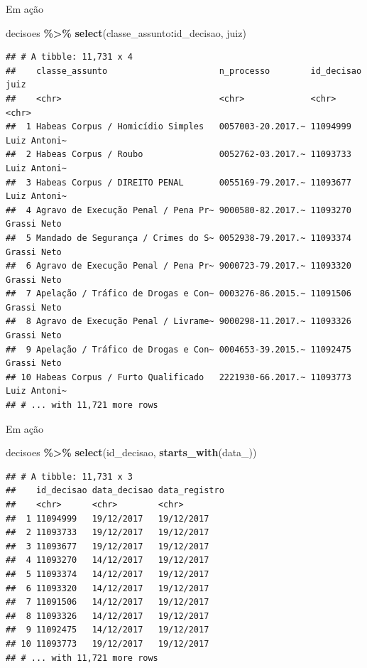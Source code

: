 \documentclass[
  10pt,
  ignorenonframetext,
]{beamer}
\newenvironment{Shaded}{\begin{snugshade}}{\end{snugshade}}
\newcommand{\KeywordTok}[1]{\textcolor[rgb]{0.13,0.29,0.53}{\textbf{#1}}}
\newcommand{\NormalTok}[1]{#1}
\newcommand{\OperatorTok}[1]{\textcolor[rgb]{0.81,0.36,0.00}{\textbf{#1}}}
\newcommand{\StringTok}[1]{\textcolor[rgb]{0.31,0.60,0.02}{#1}}
\begin{document}
\begin{frame}[fragile]{Em ação}
\protect\hypertarget{em-auxe7uxe3o-1}{}
\begin{Shaded}
\begin{Highlighting}[]
\NormalTok{decisoes }\OperatorTok{\%\textgreater{}\%}\StringTok{ }
\StringTok{  }\KeywordTok{select}\NormalTok{(classe\_assunto}\OperatorTok{:}\NormalTok{id\_decisao, juiz)}
\end{Highlighting}
\end{Shaded}

\begin{verbatim}
## # A tibble: 11,731 x 4
##    classe_assunto                      n_processo        id_decisao juiz        
##    <chr>                               <chr>             <chr>      <chr>       
##  1 Habeas Corpus / Homicídio Simples   0057003-20.2017.~ 11094999   Luiz Antoni~
##  2 Habeas Corpus / Roubo               0052762-03.2017.~ 11093733   Luiz Antoni~
##  3 Habeas Corpus / DIREITO PENAL       0055169-79.2017.~ 11093677   Luiz Antoni~
##  4 Agravo de Execução Penal / Pena Pr~ 9000580-82.2017.~ 11093270   Grassi Neto 
##  5 Mandado de Segurança / Crimes do S~ 0052938-79.2017.~ 11093374   Grassi Neto 
##  6 Agravo de Execução Penal / Pena Pr~ 9000723-79.2017.~ 11093320   Grassi Neto 
##  7 Apelação / Tráfico de Drogas e Con~ 0003276-86.2015.~ 11091506   Grassi Neto 
##  8 Agravo de Execução Penal / Livrame~ 9000298-11.2017.~ 11093326   Grassi Neto 
##  9 Apelação / Tráfico de Drogas e Con~ 0004653-39.2015.~ 11092475   Grassi Neto 
## 10 Habeas Corpus / Furto Qualificado   2221930-66.2017.~ 11093773   Luiz Antoni~
## # ... with 11,721 more rows
\end{verbatim}
\end{frame}

\begin{frame}[fragile]{Em ação}
\protect\hypertarget{em-auxe7uxe3o-2}{}
\begin{Shaded}
\begin{Highlighting}[]
\NormalTok{decisoes }\OperatorTok{\%\textgreater{}\%}\StringTok{ }
\StringTok{  }\KeywordTok{select}\NormalTok{(id\_decisao, }\KeywordTok{starts\_with}\NormalTok{(}\StringTok{\textquotesingle{}data\_\textquotesingle{}}\NormalTok{))}
\end{Highlighting}
\end{Shaded}

\begin{verbatim}
## # A tibble: 11,731 x 3
##    id_decisao data_decisao data_registro
##    <chr>      <chr>        <chr>        
##  1 11094999   19/12/2017   19/12/2017   
##  2 11093733   19/12/2017   19/12/2017   
##  3 11093677   19/12/2017   19/12/2017   
##  4 11093270   14/12/2017   19/12/2017   
##  5 11093374   14/12/2017   19/12/2017   
##  6 11093320   14/12/2017   19/12/2017   
##  7 11091506   14/12/2017   19/12/2017   
##  8 11093326   14/12/2017   19/12/2017   
##  9 11092475   14/12/2017   19/12/2017   
## 10 11093773   19/12/2017   19/12/2017   
## # ... with 11,721 more rows
\end{verbatim}
\end{frame}
\end{document}
